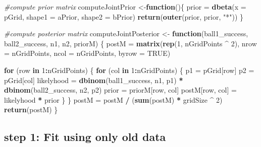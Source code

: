 \documentclass[
]{article}
\newenvironment{Shaded}{\begin{snugshade}}{\end{snugshade}}
\newcommand{\AttributeTok}[1]{\textcolor[rgb]{0.13,0.29,0.53}{#1}}
\newcommand{\CommentTok}[1]{\textcolor[rgb]{0.56,0.35,0.01}{\textit{#1}}}
\newcommand{\ConstantTok}[1]{\textcolor[rgb]{0.56,0.35,0.01}{#1}}
\newcommand{\ControlFlowTok}[1]{\textcolor[rgb]{0.13,0.29,0.53}{\textbf{#1}}}
\newcommand{\DecValTok}[1]{\textcolor[rgb]{0.00,0.00,0.81}{#1}}
\newcommand{\FunctionTok}[1]{\textcolor[rgb]{0.13,0.29,0.53}{\textbf{#1}}}
\newcommand{\NormalTok}[1]{#1}
\newcommand{\OtherTok}[1]{\textcolor[rgb]{0.56,0.35,0.01}{#1}}
\newcommand{\SpecialCharTok}[1]{\textcolor[rgb]{0.81,0.36,0.00}{\textbf{#1}}}
\newcommand{\StringTok}[1]{\textcolor[rgb]{0.31,0.60,0.02}{#1}}
\begin{document}
\begin{Shaded}
\begin{Highlighting}[]
\CommentTok{\#compute prior matrix}
\NormalTok{computeJointPrior }\OtherTok{\textless{}{-}}\ControlFlowTok{function}\NormalTok{()\{}
\NormalTok{  prior }\OtherTok{=} \FunctionTok{dbeta}\NormalTok{(}\AttributeTok{x =}\NormalTok{ pGrid, }\AttributeTok{shape1 =}\NormalTok{ aPrior, }\AttributeTok{shape2 =}\NormalTok{ bPrior)}
  \FunctionTok{return}\NormalTok{(}\FunctionTok{outer}\NormalTok{(prior, prior, }\StringTok{"*"}\NormalTok{))}
\NormalTok{\}}

\CommentTok{\#compute posterior matrix}
\NormalTok{computeJointPosterior }\OtherTok{\textless{}{-}} \ControlFlowTok{function}\NormalTok{(ball1\_success, ball2\_success, n1, n2, priorM) \{}
\NormalTok{  postM }\OtherTok{=} \FunctionTok{matrix}\NormalTok{(}\FunctionTok{rep}\NormalTok{(}\DecValTok{1}\NormalTok{, nGridPoints }\SpecialCharTok{\^{}} \DecValTok{2}\NormalTok{),}
                  \AttributeTok{nrow =}\NormalTok{ nGridPoints,}
                  \AttributeTok{ncol =}\NormalTok{ nGridPoints,}
                  \AttributeTok{byrow =} \ConstantTok{TRUE}\NormalTok{)}
  
  \ControlFlowTok{for}\NormalTok{ (row }\ControlFlowTok{in} \DecValTok{1}\SpecialCharTok{:}\NormalTok{nGridPoints) \{}
    \ControlFlowTok{for}\NormalTok{ (col }\ControlFlowTok{in} \DecValTok{1}\SpecialCharTok{:}\NormalTok{nGridPoints) \{}
\NormalTok{      p1 }\OtherTok{=}\NormalTok{ pGrid[row]}
\NormalTok{      p2 }\OtherTok{=}\NormalTok{ pGrid[col]}
\NormalTok{      likelyhood }\OtherTok{=} \FunctionTok{dbinom}\NormalTok{(ball1\_success, n1, p1) }\SpecialCharTok{*} \FunctionTok{dbinom}\NormalTok{(ball2\_success, n2, p2)}
\NormalTok{      prior }\OtherTok{=}\NormalTok{ priorM[row, col]}
\NormalTok{      postM[row, col] }\OtherTok{=}\NormalTok{ likelyhood }\SpecialCharTok{*}\NormalTok{ prior}
\NormalTok{    \}}
\NormalTok{  \}}
\NormalTok{  postM }\OtherTok{=}\NormalTok{ postM }\SpecialCharTok{/}\NormalTok{ (}\FunctionTok{sum}\NormalTok{(postM) }\SpecialCharTok{*}\NormalTok{ gridSize }\SpecialCharTok{\^{}} \DecValTok{2}\NormalTok{)}
  \FunctionTok{return}\NormalTok{(postM)}
\NormalTok{\}}
\end{Highlighting}
\end{Shaded}

\hypertarget{step-1-fit-using-only-old-data}{%
\subsection{step 1: Fit using only old
data}\label{step-1-fit-using-only-old-data}}
\end{document}

